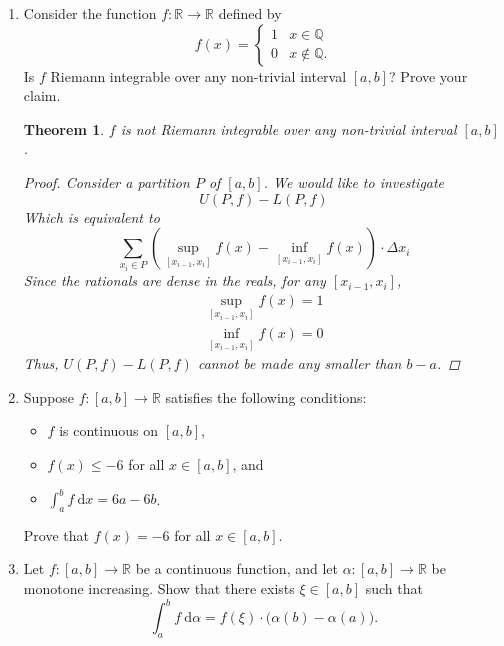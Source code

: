 \documentclass{amsart}
\newtheorem{theorem}{Theorem}
\begin{document}
\begin{enumerate}[1.]
  
    \newpage
    \item Consider the function $f: \mathbb{R} \to \mathbb{R}$ defined by
    \[ f(x) = \begin{cases} 1 & x \in \mathbb{Q} \\
                            0 & x \not \in \mathbb{Q}.
                            \end{cases}\]
    Is $f$ Riemann integrable over any non-trivial interval $[a,b]$? Prove your claim.
    \begin{theorem}
        $f$ is not Riemann integrable over any non-trivial interval $[a,b]$. 
        \begin{proof}
            Consider a partition $P$ of $[a,b]$. We would like to investigate 
            \[
                U(P,f) - L(P,f)    
            \]
            Which is equivalent to 
            \[
                \sum_{x_i \in P} \left( \sup_{[x_{i-1}, x_i]} f(x) - \inf_{[x_{i-1}, x_i]} f(x) \right) \cdot \Delta x_i
            \]
            Since the rationals are dense in the reals, for any $[x_{i-1}, x_i]$,
            \begin{align*}
                \sup_{[x_{i-1}, x_i]} f(x) = 1 \\
                \inf_{[x_{i-1}, x_i]} f(x) = 0
            \end{align*}
            Thus, $U(P,f) - L(P,f)$ cannot be made any smaller than $b - a$. 
        \end{proof}
    \end{theorem}
    
    
    \newpage
    \item  Suppose $f: [a,b] \to \mathbb{R}$ satisfies the following conditions:
    \begin{itemize}
    \item $f$ is continuous on $[a,b]$,
    \item $f(x) \leq -6$ for all $x \in [a,b]$, and
    \item $\displaystyle \int_a^b f\ \mathrm{d}x = 6a - 6b$.
    \end{itemize}
    Prove that $f(x)=-6$ for all $x \in [a,b]$.
    
 
    \newpage
    \item Let $f: [a,b] \to \mathbb{R}$ be a continuous function, and let $\alpha: [a,b] \to \mathbb{R}$ be monotone increasing. Show that there exists $\xi \in [a,b]$ such that
    \[ \int_a^b f\ \mathrm{d}\alpha = f(\xi) \cdot \big( \alpha(b) - \alpha(a) \big).\]


    \end{enumerate}
    
\end{document}
